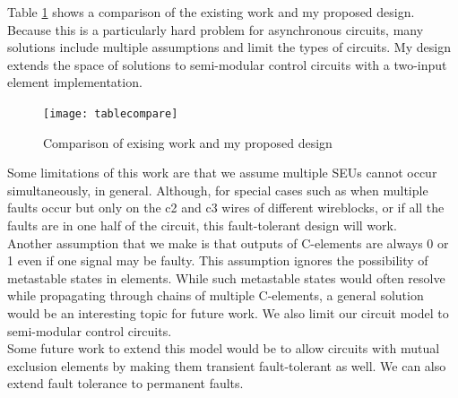 \documentclass[12pt]{report}
\begin{document}
Table \ref{fig:tablec} shows a comparison of the existing work and my proposed design.  Because this is a particularly hard problem for asynchronous circuits, many solutions include multiple assumptions and limit the types of circuits.  My design extends the space of solutions to semi-modular control circuits with a two-input element implementation. 
\begin{figure}
\centering
\texttt{[image: tablecompare]}
\caption{Comparison of exising work and my proposed design}
\label{fig:tablec}
\end{figure}

Some limitations of this work are that we assume multiple SEUs cannot occur simultaneously, in general.  Although, for special cases such as when multiple faults occur but only on the c2 and c3 wires of different wireblocks, or if all the faults are in one half of the circuit, this fault-tolerant design will work.  \\

Another assumption that we make is that outputs of C-elements are always 0 or 1 even if one signal may be faulty.  This assumption ignores the possibility of metastable states in elements.  While such metastable states would often resolve while propagating through chains of multiple C-elements, a general solution would be an interesting topic for future work.  
We also limit our circuit model to semi-modular control circuits.\\

Some future work to extend this model would be to allow circuits with mutual exclusion elements by making them transient fault-tolerant as well.  We can also extend fault tolerance to permanent faults.


\nocite{*}


%


\end{document}
